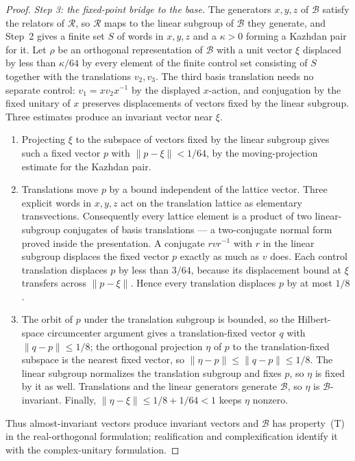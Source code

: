 \documentclass[11pt]{amsart}
\theoremstyle{definition}
\theoremstyle{remark}
\theoremstyle{plain}
\begin{document}
\begin{proof}
\emph{Step 3: the fixed-point bridge to the base.}  The generators
$x,y,z$ of $\mathcal B$ satisfy the relators of $\mathcal R$, so
$\mathcal R$ maps to the linear subgroup of $\mathcal B$ they generate,
and Step~2
gives a finite set $S$ of words in $x,y,z$ and a $\kappa>0$ forming a
Kazhdan pair for it.  Let $\rho$ be an orthogonal representation of
$\mathcal B$ with a unit vector $\xi$ displaced by less than $\kappa/64$ by
every element of the finite control set consisting of $S$ together
with the translations $v_2,v_3$.  The third basis translation needs no
separate control: $v_1=xv_2x^{-1}$ by the displayed $x$-action, and
conjugation by the fixed unitary of $x$ preserves displacements of
vectors fixed by the linear subgroup.  Three estimates produce an
invariant vector near $\xi$.
\begin{enumerate}
\item Projecting $\xi$ to the subspace of vectors fixed by the linear
subgroup gives such a fixed vector $p$ with $\lVert p-\xi\rVert<1/64$, by the
moving-projection estimate for the Kazhdan pair.
\item Translations move $p$ by a bound independent of the lattice
vector.  Three explicit words in $x,y,z$ act on the translation
lattice as elementary transvections.  Consequently every lattice
element is a product of two linear-subgroup conjugates of basis
translations --- a two-conjugate normal form proved inside the
presentation.  A conjugate $rvr^{-1}$ with $r$ in the linear subgroup
displaces the fixed vector $p$ exactly as much as $v$ does.  Each
control translation displaces $p$ by less than $3/64$, because its
displacement bound at $\xi$ transfers across $\lVert p-\xi\rVert$.
Hence every translation displaces $p$ by at most $1/8$.
\item The orbit of $p$ under the translation subgroup is bounded, so
the Hilbert-space circumcenter argument gives a translation-fixed
vector $q$ with $\lVert q-p\rVert\le1/8$; the orthogonal projection
$\eta$ of $p$ to the translation-fixed subspace is the nearest fixed
vector, so $\lVert\eta-p\rVert\le\lVert q-p\rVert\le1/8$.
The linear subgroup normalizes the translation subgroup and fixes $p$,
so $\eta$ is fixed by it as well.  Translations and the linear
generators generate $\mathcal B$, so $\eta$ is $\mathcal B$-invariant.
Finally, $\lVert \eta-\xi\rVert\le 1/8+1/64<1$ keeps $\eta$ nonzero.
\end{enumerate}
Thus almost-invariant vectors produce invariant vectors and $\mathcal B$
has property~\textup{(T)} in the real-orthogonal formulation;
realification and complexification identify it with the complex-unitary
formulation.
\end{proof}
\end{document}
